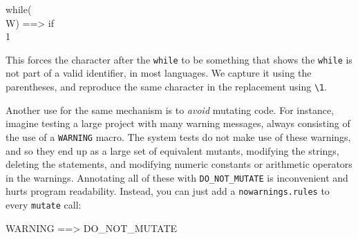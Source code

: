 \begin{code}
while(\\W) ==> if\\1 
\end{code}

\noindent This forces the character after the {\tt while} to be something
that shows the {\tt while} is not part of a valid identifier, in most
languages.  We capture it using the parentheses, and reproduce the
same character in the replacement using {\tt \textbackslash1}.

Another use for the same mechanism is to \emph{avoid} mutating code.
For instance, imagine testing a large project with many warning
messages, always consisting of the use of a {\tt WARNING} macro.  The
system tests do not make use of these warnings, and so they end up as
a large set of equivalent mutants, modifying the strings, deleting the
statements, and modifying numeric constants or arithmetic operators in
the warnings.  Annotating all of these with {\tt DO\_NOT\_MUTATE} is
inconvenient and hurts program readability.  Instead, you can just add a
{\tt nowarnings.rules} to every {\tt mutate} call:

\begin{code}
WARNING ==> DO\_NOT\_MUTATE
\end{code}
